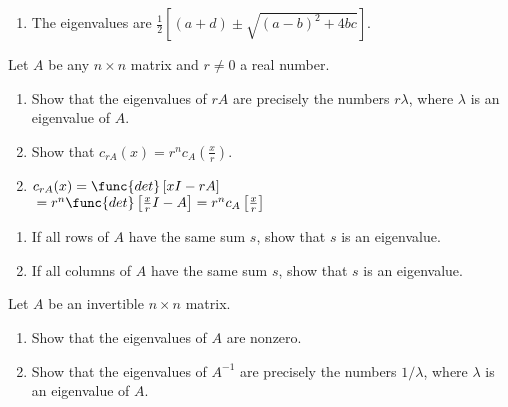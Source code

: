 \begin{multicols}{2}
\begin{ex}
\begin{enumerate}[label={\alph*.}]
\item The eigenvalues are $\frac{1}{2} \left[ (a+d) \pm \sqrt{(a-b)^2 + 4bc}\right]$.


\end{enumerate}
\end{ex}


\begin{ex}
Let $A$ be any $n \times n$ matrix and $r \neq 0$ a real number.


\begin{enumerate}[label={\alph*.}]
\item Show that the eigenvalues of $rA$ are precisely the numbers $r\lambda$, where $\lambda$ is an eigenvalue of $A$.

\item Show that $c_{rA}(x) = r^n c_A\left( \frac{x}{r} \right)$.


\end{enumerate}
\begin{sol}
\begin{enumerate}[label={\alph*.}]
\setcounter{enumi}{1}
\item  $c_{rA} (x) =\func{det} \left[ xI - rA \right]$ \\ ${} = r^n \func{det} \left[ \frac{x}{r}I-A \right] = r^n c_A \left[ \frac{x}{r} \right]$


\end{enumerate}
\end{sol}
\end{ex}

\begin{ex}
\begin{enumerate}[label={\alph*.}]
\item If all rows of $A$ have the same sum $s$, show that $s$ is an eigenvalue.

\item If all columns of $A$ have the same sum $s$, show that $s$ is an eigenvalue.

\end{enumerate}
\end{ex}

\begin{ex}
Let $A$ be an invertible $n \times n$ matrix.


\begin{enumerate}[label={\alph*.}]
\item Show that the eigenvalues of $A$ are nonzero.

\item Show that the eigenvalues of $A^{-1}$ are precisely the numbers $1/\lambda$, where $\lambda$ is an eigenvalue of $A$.


\end{enumerate}
\end{ex}
\end{multicols}
